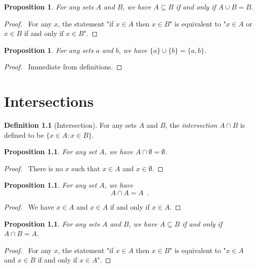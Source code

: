 \documentclass{report}
\let\qed\relax
\newtheorem{prop}[ax]{Proposition}
\theoremstyle{definition}
\newtheorem{df}[ax]{Definition}
\begin{document}
\begin{prop}
For any sets $A$ and $B$, we have $A \subseteq B$ if and only if $A \cup B = B$.
\end{prop}

\begin{proof}
\pf\ For any $x$, the statement "if $x \in A$ then $x \in B$" is equivalent to "$x \in A$ or $x \in B$ if and only if $x \in B$". \qed
\end{proof}

\begin{prop}
For any sets $a$ and $b$, we have $\{a\} \cup \{b\} = \{a,b\}$.
\end{prop}

\begin{proof}
\pf\ Immediate from definitions. \qed
\end{proof}

\chapter{Intersections}

\begin{df}[Intersection]
For any sets $A$ and $B$, the \emph{intersection} $A \cap B$ is defined to be $\{ x \in A : x \in B \}$.
\end{df}

\begin{prop}
For any set $A$, we have $A \cap \emptyset = \emptyset$.
\end{prop}

\begin{proof}
\pf\ There is no $x$ such that $x \in A$ and $x \in \emptyset$. \qed
\end{proof}

\begin{prop}
For any set $A$, we have
\[ A \cap A = A \enspace . \]
\end{prop}

\begin{proof}
\pf\ We have $x \in A$ and $x \in A$ if and only if $x \in A$. \qed
\end{proof}

\begin{prop}
For any sets $A$ and $B$, we have $A \subseteq B$ if and only if $A \cap B = A$.
\end{prop}

\begin{proof}
\pf\ For any $x$, the statement "if $x \in A$ then $x \in B$" is equivalent to "$x \in A$ and $x \in B$ if and only if $x \in A$". \qed
\end{proof}
\end{document}
